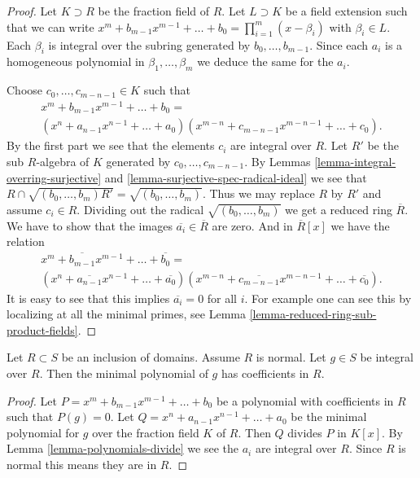 \begin{proof}
Let $K \supset R$ be the fraction field of $R$.
Let $L \supset K$ be a field extension such that
we can write $x^m + b_{m-1} x^{m-1} + \ldots + b_0 =
\prod_{i=1}^m (x-\beta_i)$ with $\beta_i \in L$.
Each $\beta_i$ is integral over the subring generated
by $b_0,\ldots,b_{m-1}$. Since each $a_i$ is a
homogeneous polynomial in $\beta_1,\ldots,\beta_m$
we deduce the same for the $a_i$.

\medskip\noindent
Choose $c_0, \ldots, c_{m-n-1} \in K$ such that
$$
\begin{matrix}
x^m + b_{m-1} x^{m-1} + \ldots + b_0 =  \\
(x^n + a_{n-1}x^{n-1} + \ldots + a_0)
(x^{m-n} + c_{m-n-1}x^{m-n-1}+ \ldots + c_0).
\end{matrix}
$$
By the first part we see that the elements $c_i$
are integral over $R$. Let $R'$ be the sub $R$-algebra
of $K$ generated by $c_0, \ldots, c_{m-n-1}$. 
By Lemmas \ref{lemma-integral-overring-surjective}
and \ref{lemma-surjective-spec-radical-ideal}
we see that $R \cap \sqrt{(b_0,\ldots,b_m)R'}
= \sqrt{(b_0,\ldots,b_m)}$. Thus we may replace
$R$ by $R'$ and assume $c_i \in R$.
Dividing out the radical $\sqrt{(b_0,\ldots,b_m)}$
we get a reduced ring $\overline{R}$.
We have to show that the images $\overline{a_i} \in \overline{R}$
are zero. And in
$\overline{R}[x]$ we have the relation
$$
\begin{matrix}
x^m + \overline{b_{m-1}} x^{m-1} + \ldots + \overline{b_0} = \\
(x^n + \overline{a_{n-1}}x^{n-1} + \ldots + \overline{a_0})
(x^{m-n} + \overline{c_{m-n-1}}x^{m-n-1}+ \ldots + \overline{c_0}).
\end{matrix}
$$
It is easy to see that this implies $\overline{a_i} = 0$ for all $i$.
For example one can see this by localizing at all the minimal
primes, see Lemma \ref{lemma-reduced-ring-sub-product-fields}.
\end{proof}

\begin{lemma}
\label{lemma-minimal-polynomial-normal-domain}
Let $R \subset S$ be an inclusion of domains.
Assume $R$ is normal. Let $g \in S$ be integral
over $R$. Then the minimal polynomial of $g$ 
has coefficients in $R$.
\end{lemma}

\begin{proof}
Let $P = x^m + b_{m-1} x^{m-1} + \ldots + b_0$
be a polynomial with coefficients in $R$
such that $P(g) = 0$. Let $Q = x^n + a_{n-1}x^{n-1} + \ldots + a_0$
be the minimal polynomial for $g$ over the fraction field
$K$ of $R$. Then $Q$ divides $P$ in $K[x]$. By Lemma
\ref{lemma-polynomials-divide} we see the $a_i$ are
integral over $R$. Since $R$ is normal this
means they are in $R$.
\end{proof}

